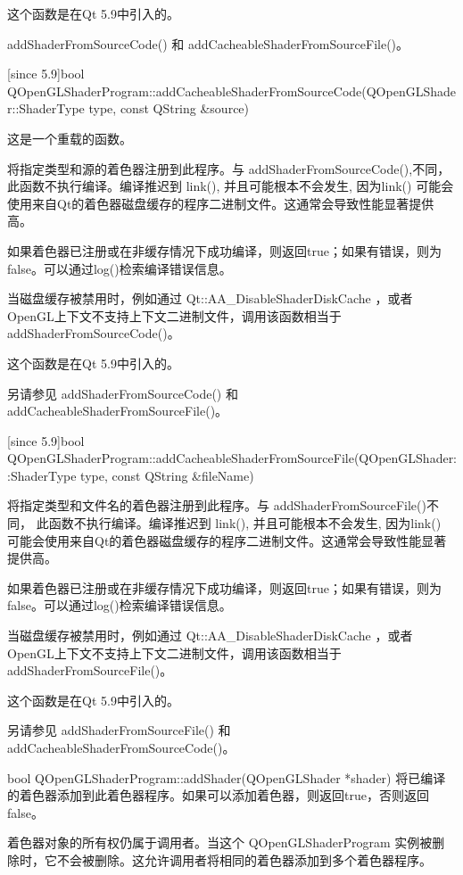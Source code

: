 这个函数是在Qt 5.9中引入的。

\begin{seeAlso}
addShaderFromSourceCode() 和 addCacheableShaderFromSourceFile()。
\end{seeAlso}

[since 5.9]bool QOpenGLShaderProgram::addCacheableShaderFromSourceCode(QOpenGLShader::ShaderType type, const QString \&source)

这是一个重载的函数。

将指定类型和源的着色器注册到此程序。与 addShaderFromSourceCode(),不同，此函数不执行编译。编译推迟到 link(), 并且可能根本不会发生, 因为link() 可能会使用来自Qt的着色器磁盘缓存的程序二进制文件。这通常会导致性能显著提供高。

如果着色器已注册或在非缓存情况下成功编译，则返回true；如果有错误，则为false。可以通过log()检索编译错误信息。

当磁盘缓存被禁用时，例如通过 Qt::AA\_DisableShaderDiskCache ，或者OpenGL上下文不支持上下文二进制文件，调用该函数相当于addShaderFromSourceCode()。

这个函数是在Qt 5.9中引入的。

另请参见 addShaderFromSourceCode() 和 addCacheableShaderFromSourceFile()。

[since 5.9]bool QOpenGLShaderProgram::addCacheableShaderFromSourceFile(QOpenGLShader::ShaderType type, const QString \&fileName)

将指定类型和文件名的着色器注册到此程序。与 addShaderFromSourceFile()不同， 此函数不执行编译。编译推迟到 link(), 并且可能根本不会发生, 因为link() 可能会使用来自Qt的着色器磁盘缓存的程序二进制文件。这通常会导致性能显著提供高。

如果着色器已注册或在非缓存情况下成功编译，则返回true；如果有错误，则为false。可以通过log()检索编译错误信息。

当磁盘缓存被禁用时，例如通过 Qt::AA\_DisableShaderDiskCache ，或者OpenGL上下文不支持上下文二进制文件，调用该函数相当于 addShaderFromSourceFile()。

这个函数是在Qt 5.9中引入的。

另请参见 addShaderFromSourceFile() 和addCacheableShaderFromSourceCode()。

bool QOpenGLShaderProgram::addShader(QOpenGLShader *shader)
将已编译的着色器添加到此着色器程序。如果可以添加着色器，则返回true，否则返回false。

着色器对象的所有权仍属于调用者。当这个 QOpenGLShaderProgram 实例被删除时，它不会被删除。这允许调用者将相同的着色器添加到多个着色器程序。

